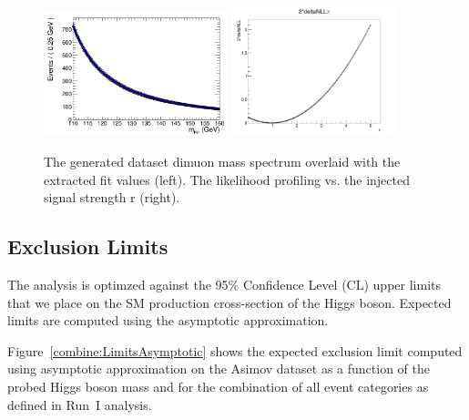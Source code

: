 \begin{figure}[hbp]
     \centering
     \includegraphics[width=0.475\textwidth]{figures/combine/asimovTests/cat6_x_fit_b.png}
     \includegraphics[width=0.43\textwidth]{figures/combine/asimovTests/NLL_asimovTest_p25GeV.png}
     \caption{The generated dataset dimuon mass spectrum overlaid with the extracted fit values (left). The
likelihood profiling vs. the injected signal strength r (right). }
     \label{combine:AsimovTests}
 \end{figure}

\subsection{Exclusion Limits}
The analysis is optimzed against the 95\% Confidence Level (CL) upper limits that we place on the SM production cross-section of the Higgs boson.
Expected limits are computed using the asymptotic approximation.

Figure~\ref{combine:LimitsAsymptotic} shows the expected exclusion limit computed using asymptotic approximation on the Asimov dataset
as a function of the probed Higgs boson mass and for the combination of all event categories as defined in Run~I analysis.


